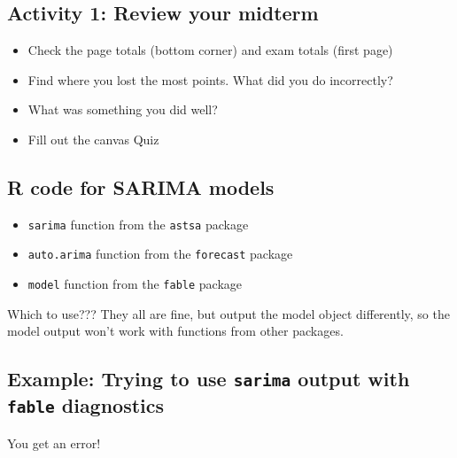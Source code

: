 \documentclass[
  letterpaper,
  DIV=11,
  numbers=noendperiod]{scrartcl}
\providecommand{\tightlist}{%
  \setlength{\itemsep}{0pt}\setlength{\parskip}{0pt}}\usepackage{longtable,booktabs,array}
\begin{document}
\subsection{Activity 1: Review your
midterm}\label{activity-1-review-your-midterm}

\begin{itemize}
\item
  Check the page totals (bottom corner) and exam totals (first page)
\item
  Find where you lost the most points. What did you do incorrectly?
\item
  What was something you did well?
\item
  Fill out the canvas Quiz
\end{itemize}

\subsection{R code for SARIMA models}\label{r-code-for-sarima-models}

\begin{itemize}
\tightlist
\item
  \texttt{sarima} function from the \texttt{astsa} package
\item
  \texttt{auto.arima} function from the \texttt{forecast} package
\item
  \texttt{model} function from the \texttt{fable} package
\end{itemize}

Which to use??? They all are fine, but output the model object
differently, so the model output won't work with functions from other
packages.

\subsection{\texorpdfstring{{Example: Trying to use \texttt{sarima}
output with \texttt{fable}
diagnostics}}{Example: Trying to use sarima output with fable diagnostics}}\label{example-trying-to-use-sarima-output-with-fable-diagnostics}

You get an error!
\end{document}
